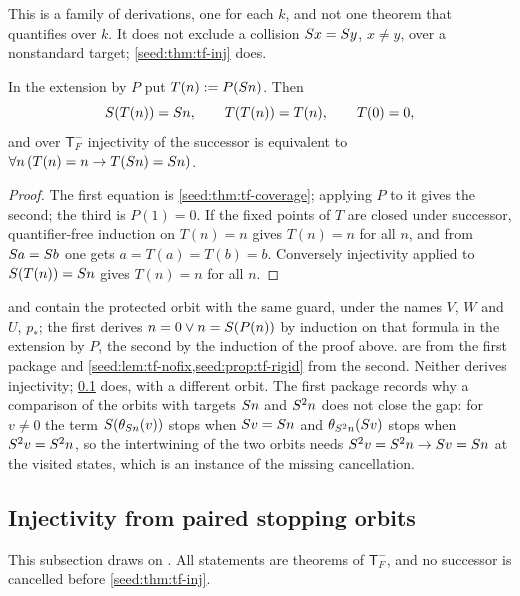 This is a family of derivations, one for each $k$, and not one theorem that
quantifies over $k$. It does not exclude a collision
$S x=S y$, $x\neq y$, over a nonstandard target; \cref{seed:thm:tf-inj}
does.

\begin{lemma}\label{seed:lem:tf-retract}
In the extension by $P$ put $T(n)\mathrel{:=} P(S n)$. Then
\[
 S(T(n))=S n,\qquad T(T(n))=T(n),\qquad T(0)=0,
\]
and over $\mathsf{T}_F^{-}$ injectivity of the successor is equivalent to
$\forall n\,(T(n)=n\to T(S n)=S n)$.
\end{lemma}

\begin{proof}
The first equation is \cref{seed:thm:tf-coverage}; applying $P$ to it gives
the second; the third is $P(1)=0$. If the fixed points of $T$ are closed
under successor, quantifier-free induction on $T(n)=n$ gives $T(n)=n$ for
all $n$, and from $S a=S b$ one gets $a=T(a)=T(b)=b$. Conversely
injectivity applied to $S(T(n))=S n$ gives $T(n)=n$ for all $n$.
\end{proof}

\begin{remark}\label{seed:rem:tf-open}
 and  contain the
protected orbit with the same guard, under the names $V$, $W$ and $U$,
$p_*$; the first derives $n=0\lor n=S(P(n))$ by induction on that formula
in the extension by $P$, the second by the induction of the proof above.
 are from the first package
and \cref{seed:lem:tf-nofix,seed:prop:tf-rigid} from the second. Neither
derives injectivity; \cref{seed:sec:tf-inj} does, with a different orbit. The
first package records why a comparison of the
orbits with targets $S n$ and $S^2n$ does not close the gap: for
$v\neq0$ the term $S(\theta_{S n}(v))$ stops when
$S v=S n$ and $\theta_{S^2n}(S v)$ stops when
$S^2v=S^2n$, so the intertwining of the two orbits needs
$S^2v=S^2n\to S v=S n$ at the visited states, which is an instance
of the missing cancellation.
\end{remark}

\subsection{Injectivity from paired stopping orbits}
\label{seed:sec:tf-inj}

This subsection draws on . All statements are
theorems of $\mathsf{T}_F^{-}$, and no successor is cancelled before
\cref{seed:thm:tf-inj}.

